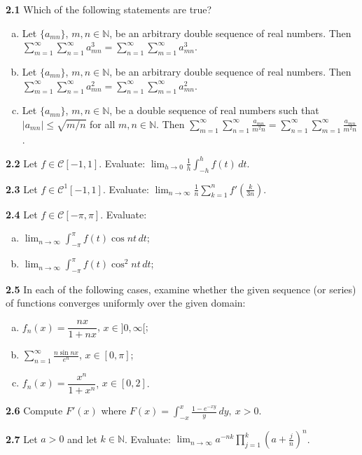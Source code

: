 \documentclass[11pt,a4paper]{article}
\newcommand{\N}{\mathbb{N}}
\newcommand{\qitem}[1]{\par\medskip\noindent\textbf{#1}\hspace{0.5em}}
\begin{document}
\qitem{2.1} Which of the following statements are true?
\begin{enumerate}[a.]
  \item Let $\{a_{mn}\}$, $m, n \in \N$, be an arbitrary double sequence of real numbers. Then $\sum_{m=1}^{\infty}\sum_{n=1}^{\infty} a_{mn}^3 = \sum_{n=1}^{\infty}\sum_{m=1}^{\infty} a_{mn}^3$.
  \item Let $\{a_{mn}\}$, $m, n \in \N$, be an arbitrary double sequence of real numbers. Then $\sum_{m=1}^{\infty}\sum_{n=1}^{\infty} a_{mn}^2 = \sum_{n=1}^{\infty}\sum_{m=1}^{\infty} a_{mn}^2$.
  \item Let $\{a_{mn}\}$, $m, n \in \N$, be a double sequence of real numbers such that $|a_{mn}| \le \sqrt{m/n}$ for all $m, n \in \N$. Then $\sum_{m=1}^{\infty}\sum_{n=1}^{\infty} \frac{a_{mn}}{m^2 n} = \sum_{n=1}^{\infty}\sum_{m=1}^{\infty} \frac{a_{mn}}{m^2 n}$.
\end{enumerate}

\qitem{2.2} Let $f \in \mathcal{C}[-1, 1]$. Evaluate: $\displaystyle\lim_{h \to 0} \frac{1}{h}\int_{-h}^{h} f(t)\,dt$.

\qitem{2.3} Let $f \in \mathcal{C}^1[-1, 1]$. Evaluate: $\displaystyle\lim_{n \to \infty} \frac{1}{n}\sum_{k=1}^{n} f'\left(\frac{k}{3n}\right)$.

\qitem{2.4} Let $f \in \mathcal{C}[-\pi, \pi]$. Evaluate:
\begin{enumerate}[a.]
  \item $\displaystyle\lim_{n \to \infty} \int_{-\pi}^{\pi} f(t)\cos nt\,dt$;
  \item $\displaystyle\lim_{n \to \infty} \int_{-\pi}^{\pi} f(t)\cos^2 nt\,dt$;
\end{enumerate}

\qitem{2.5} In each of the following cases, examine whether the given sequence (or series) of functions converges uniformly over the given domain:
\begin{enumerate}[a.]
  \item $f_n(x) = \dfrac{nx}{1+nx}$, $x \in ]0, \infty[$;
  \item $\displaystyle\sum_{n=1}^{\infty} \frac{n\sin nx}{e^n}$, $x \in [0, \pi]$;
  \item $f_n(x) = \dfrac{x^n}{1+x^n}$, $x \in [0, 2]$.
\end{enumerate}

\qitem{2.6} Compute $F'(x)$ where $F(x) = \displaystyle\int_{-x}^{x} \frac{1 - e^{-xy}}{y}\,dy,\ x > 0$.

\qitem{2.7} Let $a > 0$ and let $k \in \N$. Evaluate: $\displaystyle\lim_{n \to \infty} a^{-nk} \prod_{j=1}^{k} \left(a + \frac{j}{n}\right)^n$.
\end{document}
